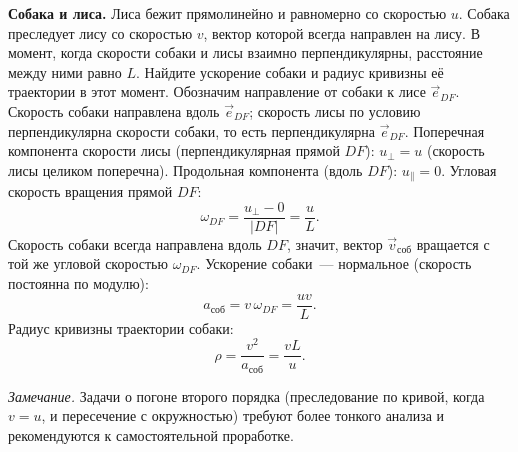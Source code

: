 \documentclass[../main.tex]{subfiles}
\begin{document}
\begin{example}
\textbf{Собака и лиса.}
Лиса бежит прямолинейно и равномерно со скоростью $u$.
Собака преследует лису со скоростью $v$, вектор которой всегда направлен
на лису. В момент, когда скорости собаки и лисы взаимно перпендикулярны,
расстояние между ними равно $L$.
Найдите ускорение собаки и радиус кривизны её траектории в этот момент.
Обозначим направление от собаки к лисе $\vec{e}_{DF}$.
Скорость собаки направлена вдоль $\vec{e}_{DF}$; скорость лисы
по условию перпендикулярна скорости собаки, то есть перпендикулярна $\vec{e}_{DF}$.
Поперечная компонента скорости лисы (перпендикулярная прямой $DF$):
$u_\perp = u$ (скорость лисы целиком поперечна).
Продольная компонента (вдоль $DF$): $u_\parallel = 0$.
Угловая скорость вращения прямой $DF$:
\[
\omega_{DF} = \frac{u_\perp - 0}{|DF|} = \frac{u}{L}.
\]
Скорость собаки всегда направлена вдоль $DF$, значит, вектор $\vec{v}_{\text{соб}}$
вращается с той же угловой скоростью $\omega_{DF}$.
Ускорение собаки~--- нормальное (скорость постоянна по модулю):
\[
a_{\text{соб}} = v\,\omega_{DF} = \frac{uv}{L}.
\]
Радиус кривизны траектории собаки:
\[
\rho = \frac{v^2}{a_{\text{соб}}} = \frac{vL}{u}.
\]
\end{example}

\noindent\textit{Замечание.} Задачи о погоне второго порядка (преследование по
кривой, когда $v = u$, и пересечение с окружностью) требуют более тонкого анализа
и рекомендуются к самостоятельной проработке.
\end{document}
